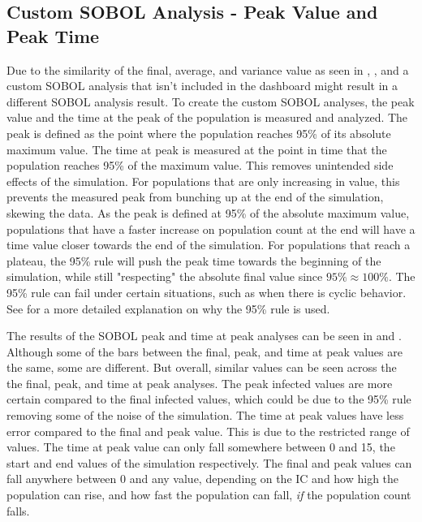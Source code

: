 \subsection{Custom SOBOL Analysis - Peak Value and Peak Time}
Due to the similarity of the final, average, and variance value as seen in , , and  a custom SOBOL analysis that isn't included in the dashboard might result in a different SOBOL analysis result. 
To create the custom SOBOL analyses, the peak value and the time at the peak of the population is measured and analyzed. 
The peak is defined as the point where the population reaches 95\% of its absolute maximum value. 
The time at peak is measured at the point in time that the population reaches 95\% of the maximum value. 
This removes unintended side effects of the simulation. 
For populations that are only increasing in value, this prevents the measured peak from bunching up at the end of the simulation, skewing the data. 
As the peak is defined at 95\% of the absolute maximum value, populations that have a faster increase on population count at the end will have a time value closer towards the end of the simulation. 
For populations that reach a plateau, the 95\% rule will push the peak time towards the beginning of the simulation, while still "respecting" the absolute final value since $95\% \approx 100\%$. 
The 95\% rule can fail under certain situations, such as when there is cyclic behavior. 
See  for a more detailed explanation on why the 95\% rule is used. 

The results of the SOBOL peak and time at peak analyses can be seen in  and . 
Although some of the bars between the final, peak, and time at peak values are the same, some are different. 
But overall, similar values can be seen across the the final, peak, and time at peak analyses. 
The peak infected values are more certain compared to the final infected values, which could be due to the 95\% rule removing some of the noise of the simulation. 
The time at peak values have less error compared to the final and peak value. 
This is due to the restricted range of values. The time at peak value can only fall somewhere between 0 and 15, the start and end values of the simulation respectively. 
The final and peak values can fall anywhere between 0 and any value, depending on the IC and how high the population can rise, and how fast the population can fall, \textit{if} the population count falls. 

